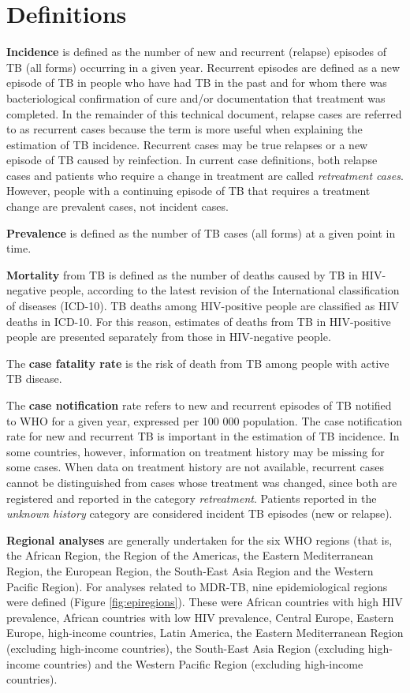 \section{Definitions}
\textbf{Incidence} is defined as the number of new and recurrent (relapse) episodes of TB (all forms) occurring in a given year. Recurrent episodes are defined as a new episode of TB in people who have had TB in the past and for whom there was bacteriological confirmation of cure and/or documentation that treatment was completed. In the remainder of this technical document, relapse cases are referred to as recurrent cases because the term is more useful when explaining the estimation of TB incidence. Recurrent cases may be true relapses or a new episode of TB caused by reinfection. In current case definitions, both relapse cases and patients who require a change in treatment are called \textit{retreatment cases}. However, people with a continuing episode of TB that requires a treatment change are prevalent cases, not incident cases.

\textbf{Prevalence} is defined as the number of TB cases (all forms) at a given point in time. 

\textbf{Mortality} from TB is defined as the number of deaths caused by TB in HIV-negative people, according to the latest revision of the International classification of diseases (ICD-10). TB deaths among HIV-positive people are classified as HIV deaths in ICD-10. For this reason, estimates of deaths from TB in HIV-positive people are presented separately from those in HIV-negative people.

The \textbf{case fatality rate} is the risk of death from TB among people with active TB disease.

The \textbf{case notification} rate refers to new and recurrent episodes of TB notified to WHO for a given year, expressed per 100 000 population. The case notification rate for new and recurrent TB is important in the estimation of TB incidence. In some countries, however, information on treatment history may be missing for some cases. When data on treatment history are not available, recurrent cases cannot be distinguished from cases whose treatment was changed, since both are registered and reported in the category \textit{retreatment}. Patients reported in the \textit{unknown history} category are considered incident TB episodes (new or relapse). 

\textbf{Regional analyses} are generally undertaken for the six WHO regions (that is, the African Region, the Region of the Americas, the Eastern Mediterranean Region, the European Region, the South-East Asia Region and the Western Pacific Region). For analyses related to MDR-TB, nine epidemiological regions were defined (Figure \ref{fig:epiregions}). These were African countries with high HIV prevalence, African countries with low HIV prevalence, Central Europe, Eastern Europe, high-income countries, Latin America, the Eastern Mediterranean Region (excluding high-income countries), the South-East Asia Region (excluding high-income countries) and the Western Pacific Region (excluding high-income countries). 


  